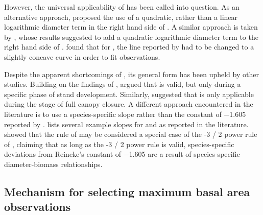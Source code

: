 However, the universal applicability of  has been called into question.  As an alternative approach, \textcite{Charru2012} proposed the use of a quadratic, rather than a linear logarithmic diameter term in the right hand side of . A similar approach is taken by \textcite{Schuetz2008,Schuetz2010,Zeide1995}, whose results suggested to add a quadratic logarithmic diameter term to the right hand side of .  \textcite{Meyer1938} found that for \ponderosa{}, the line reported by \textcite{Reineke1933} had to be changed to a slightly concave curve in order to fit observations.  

Despite the apparent shortcomings of , its general form has been upheld by other studies.  Building on the findings of \textcite{Drew1979}, \textcite{VanderSchaaf2010,VanderSchaaf2008} argued that  is valid, but only during a specific phase of stand development.  Similarly, \textcite{Zeide1985} suggested that  is only applicable during the stage of full canopy closure.  A different approach encountered in the literature is to use a species-specific slope rather than the constant of \num{-1.605} reported by \textcite{Reineke1933} \parencite{MacKinney1935,Pretzsch2005,Charru2012,Pretzsch2006,Río2001,Sterba1987,Vacchiano2013,Vospernik2015,Zeide1985,Zeide1987,VanderSchaaf2007}.   lists several example slopes for \beech{} and \spruce{} as reported in the literature.  \textcite{Pretzsch2000,Pretzsch2002} showed that the rule of \textcite{Reineke1933} may be considered a special case of the \num{-3 / 2} power rule of \textcite{Yoda1963}, claiming that as long as the \num{-3 / 2} power rule is valid, species-specific deviations from Reineke’s constant of \num{-1.605} are a result of species-specific diameter-biomass relationships.

\subsection{Mechanism for selecting maximum basal area observations}

